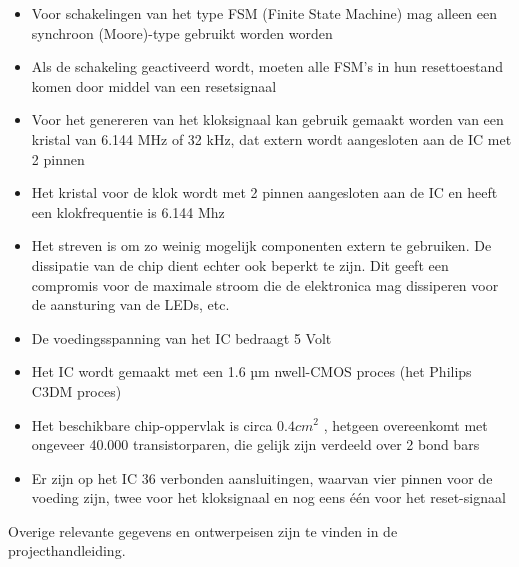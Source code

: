\documentclass{scrartcl} %
\begin{document}
\begin{itemize}
	\item Voor schakelingen van het type FSM (Finite State Machine) mag alleen een synchroon (Moore)-type gebruikt worden
	worden
	\item Als de schakeling geactiveerd wordt, moeten alle FSM’s in hun resettoestand komen door middel van een resetsignaal
	\item Voor het genereren van het kloksignaal kan gebruik gemaakt worden van een kristal van 6.144 MHz of 32 kHz, dat extern wordt aangesloten aan de IC met 2 pinnen
	\item Het kristal voor de klok wordt met 2 pinnen aangesloten aan de IC en heeft een klokfrequentie is 6.144 Mhz
	\item Het streven is om zo weinig mogelijk componenten extern te gebruiken. De dissipatie van de chip dient echter ook beperkt te zijn. Dit geeft een compromis voor de maximale stroom
	die de elektronica mag dissiperen voor de aansturing van de LEDs, etc.
	\item De voedingsspanning van het IC bedraagt 5 Volt
	\item Het IC wordt gemaakt met een 1.6 µm nwell-CMOS proces (het Philips C3DM proces)
	\item Het beschikbare chip-oppervlak is circa $0.4  cm^2$ , hetgeen overeenkomt met ongeveer 40.000 transistorparen, die gelijk zijn verdeeld over 2 bond bars
	\item Er zijn op het IC 36 verbonden aansluitingen, waarvan vier pinnen voor de voeding zijn, twee voor het kloksignaal en nog eens één voor het reset-signaal
\end{itemize}

Overige relevante gegevens en ontwerpeisen zijn te vinden in de projecthandleiding.
\end{document}
